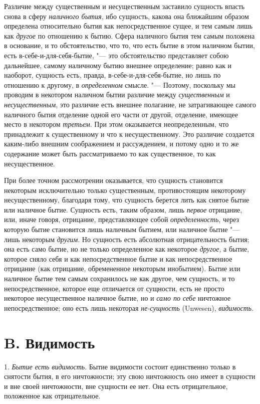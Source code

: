 Различие между существенным и несущественным заставило сущность впасть снова
в сферу {\em наличного бытия}, ибо сущность, какова она
ближайшим образом определена относительно бытия как непосредственное сущее,
и тем самым лишь как {\em другое} по отношению к бытию.
Сфера наличного бытия тем самым положена в основание, и то обстоятельство,
что то, что есть бытие в этом наличном бытии, есть в-себе-и-для-себя-бытие,
"--- это обстоятельство представляет собою дальнейшее, самому наличному бытию
внешнее определение; равно как и наоборот, сущность есть, правда,
в-себе-и-для-себя-бытие, но лишь по отношению к другому, в
{\em определенном} смысле. "--- Поэтому, поскольку мы
проводим в некотором наличном бытии различие между
{\em существенным} и
{\em несущественным}, это различие есть внешнее
полагание, не затрагивающее самого наличного бытия отделение одной его
части от другой, отделение, имеющее место в некотором
{\em третьем}. При этом оказывается неопределенным, что
принадлежит к существенному и что к несущественному. Это различие создается
каким-либо внешним соображением и рассуждением, и потому одно и то же
содержание может быть рассматриваемо то как существенное, то как
несущественное.

При более точном рассмотрении оказывается, что сущность становится некоторым
исключительно только существенным, противостоящим некоторому
несущественному, благодаря тому, что сущность берется лить как снятое бытие
или наличное бытие. Сущность есть, таким образом, лишь
{\em первое} отрицание, или, иначе говоря, отрицание,
представляющее собой {\em определенность}, через
которую бытие становится лишь наличным бытием, или наличное бытие "--- лишь
некоторым {\em другим}. Но сущность есть абсолютная
отрицательность бытия; она есть само бытие, но не только определенное как
некоторое {\em другое}, а бытие, которое сняло себя и
как непосредственное бытие и как непосредственное отрицание (как отрицание,
обремененное некоторым инобытием). Бытие или наличное бытие тем самым
сохранилось не как другое, чем сущность, и то непосредственное, которое еще
отличается от сущности, есть не просто некоторое несущественное наличное
бытие, но и {\em само по себе} ничтожное
непосредственное; оно есть лишь некоторая
{\em не-сущность} (Unwesen),
{\em видимость}.

\section[B. Видимость]{B. Видимость}
1. {\em Бытие есть
видимость}. Бытие видимости состоит единственно только в снятости бытия, в
его ничтожности; эту свою ничтожность оно имеет в сущности и вне своей
ничтожности, вне сущности ее нет. Она есть отрицательное, положенное как
отрицательное.

